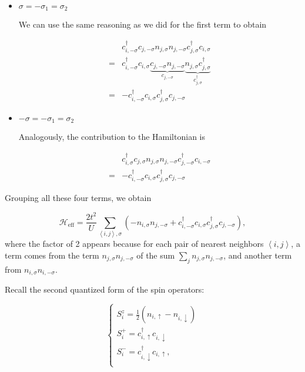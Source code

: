 \begin{itemize}
\item $\sigma = - \sigma_1 = \sigma_2$

We can use the same reasoning as we did for the first term to obtain

\begin{equation*}
\begin{split}
&c_{i,-\sigma}^\dagger c_{j,-\sigma} n_{j,\sigma} n_{j, -\sigma} c_{j, \sigma}^\dagger c_{i, \sigma} \\
=& c_{i, -\sigma}^\dagger c_{i,\sigma} \underbrace{c_{j,-\sigma} n_{j, -\sigma}}_{c_{j,-\sigma}} \underbrace{n_{j, \sigma} c_{j, \sigma}^\dagger}_{c_{j,\sigma}^\dagger} \\
=& - c_{i, -\sigma}^\dagger c_{i,\sigma} c_{j, \sigma}^\dagger c_{j,-\sigma}
\end{split}
\end{equation*}

\item $-\sigma = - \sigma_1 = \sigma_2$

Analogously, the contribution to the Hamiltonian is

\begin{equation*}
\begin{split}
&c_{i,\sigma}^\dagger c_{j,\sigma} n_{j,\sigma} n_{j, -\sigma} c_{j, -\sigma}^\dagger c_{i, -\sigma} \\
=& - c_{i, -\sigma}^\dagger c_{i,\sigma} c_{j, \sigma}^\dagger c_{j,-\sigma}
\end{split}
\end{equation*}

\end{itemize}

Grouping all these four terms, we obtain

\begin{equation}
\mathcal{H}_{\text{eff}} = \frac{2t^2}{U} \sum_{\left\langle i, j \right\rangle, \sigma} ( - n_{i,\sigma} n_{j,-\sigma} + c_{i,-\sigma}^\dagger c_{i,\sigma} c_{j,\sigma}^\dagger c_{j,-\sigma} ) ,
\end{equation}
where the factor of 2 appears because for each pair of nearest neighbors $\left\langle i, j \right\rangle$, a term comes from the term $n_{j,\sigma} n_{j,-\sigma}$ of the sum $\sum_j n_{j,\sigma} n_{j,-\sigma}$, and another term from $n_{i,\sigma} n_{i,-\sigma}$.

Recall the second quantized form of the spin operators:

\begin{equation}
\begin{cases}
S_i^z = \frac{1}{2} ( n_{i,\uparrow} - n_{i,\downarrow} ) \\
S_i^+ = c_{i,\uparrow}^\dagger c_{i,\downarrow} \\
S_i^- = c_{i,\downarrow}^\dagger c_{i,\uparrow}, \\
\end{cases}
\end{equation}

